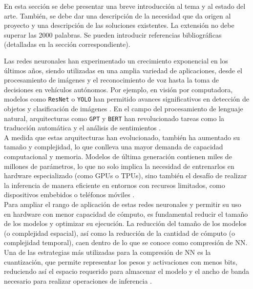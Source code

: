 \documentclass[a4paper,11pt, oneside]{article}
\begin{document}
    {
        \color{gray}
        \scriptsize
        En esta sección se debe presentar una breve introducción al tema y al estado del arte. También, se debe dar una descripción de la necesidad que da origen al proyecto y una descripción de las soluciones existentes. La extensión no debe superar las 2000 palabras. Se pueden introducir referencias bibliográficas (detalladas en la sección correspondiente).\\
    }

Las redes neuronales han experimentado un crecimiento exponencial en los últimos años, siendo utilizadas en una amplia variedad de aplicaciones, desde el procesamiento de imágenes y el reconocimiento de voz hasta la toma de decisiones en vehículos autónomos. Por ejemplo, en visión por computadora, modelos como \texttt{ResNet} o \texttt{YOLO} han permitido avances significativos en detección de objetos y clasificación de imágenes \cite{8833671}. En el campo del procesamiento de lenguaje natural, arquitecturas como \texttt{GPT} y \texttt{BERT} han revolucionado tareas como la traducción automática y el análisis de sentimientos \cite{kheiri2023sentimentgptexploitinggptadvanced}. \\

A medida que estas arquitecturas han evolucionado, también ha aumentado su tamaño y complejidad, lo que conlleva una mayor demanda de capacidad computacional y memoria. Modelos de última generación contienen miles de millones de parámetros, lo que no solo implica la necesidad de entrenarlos en hardware especializado (como GPUs o TPUs), sino también el desafío de realizar la inferencia de manera eficiente en entornos con recursos limitados, como dispositivos embebidos o teléfonos móviles \cite{9474372} \cite{Wu_2016_CVPR}. \\

Para ampliar el rango de aplicación de estas redes neuronales y permitir su uso en hardware con menor capacidad de cómputo, es fundamental reducir el tamaño de los modelos y optimizar su ejecución. La reducción del tamaño de los modelos (o complejidad espacial), así como la reducción de la cantidad de cómputo (o complejidad temporal), caen dentro de lo que se conoce como compresión de NN. Una de las estrategias más utilizadas para la compresión de NN es la cuantización, que permite representar los pesos y activaciones con menos bits, reduciendo así el espacio requerido para almacenar el modelo y el ancho de banda necesario para realizar operaciones de inferencia \cite{DBLP:journals/corr/abs-2010-03954}. \\
\end{document}
